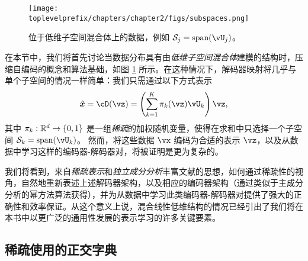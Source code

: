\documentclass[../../book-main_zh.tex]{subfiles}
\begin{document}
\begin{figure}
    \centering
    \texttt{[image: \\toplevelprefix/chapters/chapter2/figs/subspaces.png]}
    \caption{位于低维子空间混合体上的数据，例如 $\mathcal{S}_j = \mbox{span}(\vU_j)$。}
    \label{fig:subspaces}
\end{figure}

在本节中，我们将首先讨论当数据分布具有由\textit{低维子空间混合体}建模的结构时，压缩自编码的概念和算法基础，如图 \ref{fig:subspaces} 所示。在这种情况下，解码器映射将几乎与单个子空间的情况一样简单：我们只需通过以下方式表示
\begin{equation}\label{eq:mixture-subspaces-decoder-first-cut}
    \hat{\x} = \cD(\vz) = \left( \sum_{k=1}^K \pi_k(\vz)\vU_k \right) \vz,
\end{equation}
其中 $\pi_k : \R^d \to \set{0,1}$ 是一组\textit{稀疏}的加权随机变量，使得在求和中只选择一个子空间 $\mathcal{S}_k = \mbox{span}(\vU_k)$。
然而，将这些数据 $\vx$ 编码为合适的表示 $\vz$，以及从数据中学习这样的编码器-解码器对，将被证明是更为复杂的。

我们将看到，来自\textit{稀疏表示}和\textit{独立成分分析}丰富文献的思想，如何通过稀疏性的视角，自然地重新表述上述解码器架构，以及相应的编码器架构（通过类似于主成分分析的幂方法算法获得），并为从数据中学习此类编码器-解码器对提供了强大的正确性和效率保证。从这个意义上说，混合线性低维结构的情况已经引出了我们将在本书中以更广泛的通用性发展的表示学习的许多关键要素。


\subsection{稀疏使用的正交字典}

\end{document}
